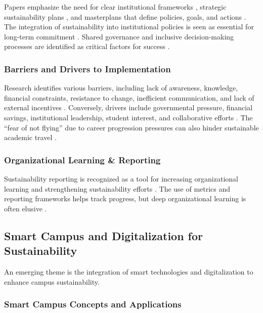 \documentclass[12pt,a4paper]{article}
\begin{document}
Papers emphasize the need for clear institutional frameworks \citep{Alshuwaikhat2008, Abubakar2020}, strategic sustainability plans \citep{White2014, Romero2017, Eby2023}, and masterplans that define policies, goals, and actions \citep{Romero2017}. The integration of sustainability into institutional policies is seen as essential for long-term commitment \citep{DaSilva2023, Alalawi2024}. Shared governance and inclusive decision-making processes are identified as critical factors for success \citep{DjukicMin2025}.

\subsubsection{Barriers and Drivers to Implementation}

Research identifies various barriers, including lack of awareness, knowledge, financial constraints, resistance to change, inefficient communication, and lack of external incentives \citep{Alshuwaiwat2008, Alalawi2024, Herzanita2024, Geh2024}. Conversely, drivers include governmental pressure, financial savings, institutional leadership, student interest, and collaborative efforts \citep{Geh2023}. The ``fear of not flying'' due to career progression pressures can also hinder sustainable academic travel \citep{NurseyBray2019}.

\subsubsection{Organizational Learning \& Reporting}

Sustainability reporting is recognized as a tool for increasing organizational learning and strengthening sustainability efforts \citep{WashingtonOttombre2024}. The use of metrics and reporting frameworks helps track progress, but deep organizational learning is often elusive \citep{WashingtonOttombre2024, WashingtonOttombreBigalke2018, Rosa2024}.

\subsection{Smart Campus and Digitalization for Sustainability}

An emerging theme is the integration of smart technologies and digitalization to enhance campus sustainability.

\subsubsection{Smart Campus Concepts and Applications}
\end{document}
